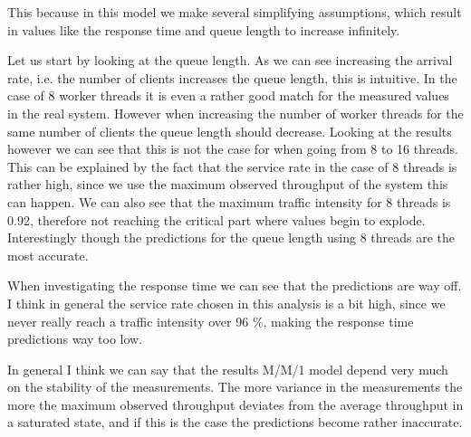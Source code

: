 \documentclass[11pt,a4paper]{article}
\begin{document}
%
This because in this model we make several simplifying assumptions, which result in values like the response time and queue length to increase infinitely.
%
\par
%
Let us start by looking at the queue length.
%
As we can see increasing the arrival rate, i.e. the number of clients increases the queue length, this is intuitive. 
%
In the case of 8 worker threads it is even a rather good match for the measured values in the real system.
%
However when increasing the number of worker threads for the same number of clients the queue length should decrease.
%
Looking at the results however we can see that this is not the case for when going from 8 to 16 threads.
%
This can be explained by the fact that the service rate in the case of 8 threads is rather high, since we use the maximum observed throughput of the system this can happen.
%
We can also see that the maximum traffic intensity for 8 threads is 0.92, therefore not reaching the critical part where values begin to explode.
%
Interestingly though the predictions for the queue length using 8 threads are the most accurate.
%
\par
%
When investigating the response time we can see that the predictions are way off.
%
I think in general the service rate chosen in this analysis is a bit high, since we never really reach a traffic intensity over 96 \%, making the response time predictions way too low.
%
\par
%
In general I think we can say that the results M/M/1 model depend very much on the stability of the measurements.
%
The more variance in the measurements the more the maximum observed throughput deviates from the average throughput in a saturated state, and if this is the case the predictions become rather inaccurate.
%
\end{document}
